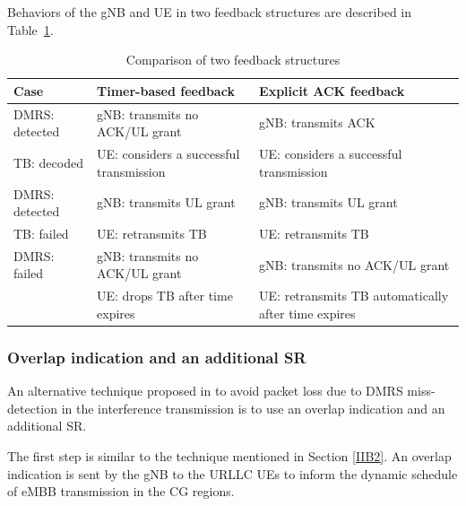 \documentclass{ieeeaccess}
\begin{document}
Behaviors of the gNB and UE in two feedback structures are described in Table~\ref{tab1}.

\begin{table}[htbp]
\caption{Comparison of two feedback structures}
\begin{center}
\begin{tabular}{|p{8em}|p{8em}|p{8em}|}
 \hline
 \textbf{Case} & \textbf{Timer-based feedback}&\textbf{Explicit ACK feedback}\\
 \hline
 DMRS: detected&gNB: transmits no ACK/UL grant&gNB: transmits ACK\\TB: decoded &UE: considers a successful transmission &UE: considers a successful transmission\\
 \hline
  DMRS: detected&gNB: transmits UL grant &gNB: transmits UL grant\\TB: failed & UE: retransmits TB&UE: retransmits TB\\
 \hline
DMRS: failed&gNB: transmits no ACK/UL grant&gNB: transmits no ACK/UL grant\\ &UE: drops TB after time expires& UE: retransmits TB automatically after time expires\\

 
 \hline
\end{tabular}
\label{tab1}
\end{center}
\vspace{-5mm}
\end{table}


\subsubsection{Overlap indication and an additional SR}\label{IIB3}


An alternative technique proposed in \cite{ad99} to avoid packet loss due to DMRS miss-detection in the interference transmission is to use an overlap indication and an additional SR.

The first step is similar to the technique mentioned in Section \ref{IIB2}. An overlap indication is sent by the gNB to the URLLC UEs to inform the dynamic schedule of eMBB transmission in the CG regions.
\end{document}
